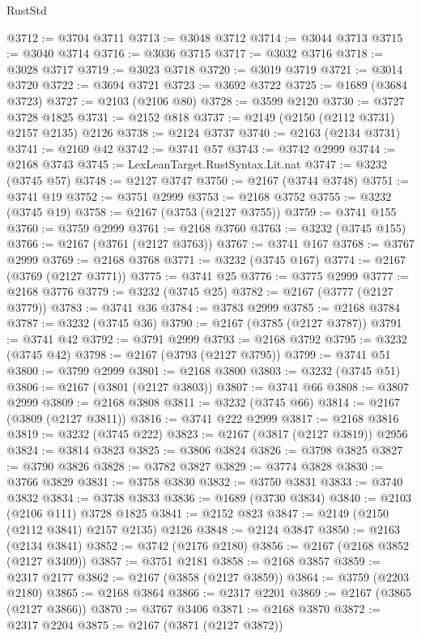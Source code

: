 \begin{lexlean}{RustStd}
\begin{coremodule}
{\begin{coremodule}
{{{{{{{{{{{{{{{{@3712 := @3704 @3711
@3713 := @3048 @3712
@3714 := @3044 @3713
@3715 := @3040 @3714
@3716 := @3036 @3715
@3717 := @3032 @3716
@3718 := @3028 @3717
@3719 := @3023 @3718
@3720 := @3019 @3719
@3721 := @3014 @3720
@3722 := @3694 @3721
@3723 := @3692 @3722
@3725 := @1689 (@3684 @3723)
@3727 := @2103 (@2106 @80)
@3728 := @3599 @2120
@3730 := @3727 @3728 @1825
@3731 := @2152 @818
@3737 := @2149 (@2150 (@2112 @3731) @2157 @2135) @2126
@3738 := @2124 @3737
@3740 := @2163 (@2134 @3731)
@3741 := @2169 @42
@3742 := @3741 @57
@3743 := @3742 @2999
@3744 := @2168 @3743
@3745 := LexLeanTarget.RustSyntax.Lit.nat
@3747 := @3232 (@3745 @57)
@3748 := @2127 @3747
@3750 := @2167 (@3744 @3748)
@3751 := @3741 @19
@3752 := @3751 @2999
@3753 := @2168 @3752
@3755 := @3232 (@3745 @19)
@3758 := @2167 (@3753 (@2127 @3755))
@3759 := @3741 @155
@3760 := @3759 @2999
@3761 := @2168 @3760
@3763 := @3232 (@3745 @155)
@3766 := @2167 (@3761 (@2127 @3763))
@3767 := @3741 @167
@3768 := @3767 @2999
@3769 := @2168 @3768
@3771 := @3232 (@3745 @167)
@3774 := @2167 (@3769 (@2127 @3771))
@3775 := @3741 @25
@3776 := @3775 @2999
@3777 := @2168 @3776
@3779 := @3232 (@3745 @25)
@3782 := @2167 (@3777 (@2127 @3779))
@3783 := @3741 @36
@3784 := @3783 @2999
@3785 := @2168 @3784
@3787 := @3232 (@3745 @36)
@3790 := @2167 (@3785 (@2127 @3787))
@3791 := @3741 @42
@3792 := @3791 @2999
@3793 := @2168 @3792
@3795 := @3232 (@3745 @42)
@3798 := @2167 (@3793 (@2127 @3795))
@3799 := @3741 @51
@3800 := @3799 @2999
@3801 := @2168 @3800
@3803 := @3232 (@3745 @51)
@3806 := @2167 (@3801 (@2127 @3803))
@3807 := @3741 @66
@3808 := @3807 @2999
@3809 := @2168 @3808
@3811 := @3232 (@3745 @66)
@3814 := @2167 (@3809 (@2127 @3811))
@3816 := @3741 @222 @2999
@3817 := @2168 @3816
@3819 := @3232 (@3745 @222)
@3823 := @2167 (@3817 (@2127 @3819)) @2956
@3824 := @3814 @3823
@3825 := @3806 @3824
@3826 := @3798 @3825
@3827 := @3790 @3826
@3828 := @3782 @3827
@3829 := @3774 @3828
@3830 := @3766 @3829
@3831 := @3758 @3830
@3832 := @3750 @3831
@3833 := @3740 @3832
@3834 := @3738 @3833
@3836 := @1689 (@3730 @3834)
@3840 := @2103 (@2106 @111) @3728 @1825
@3841 := @2152 @823
@3847 := @2149 (@2150 (@2112 @3841) @2157 @2135) @2126
@3848 := @2124 @3847
@3850 := @2163 (@2134 @3841)
@3852 := @3742 (@2176 @2180)
@3856 := @2167 (@2168 @3852 (@2127 @3409))
@3857 := @3751 @2181
@3858 := @2168 @3857
@3859 := @2317 @2177
@3862 := @2167 (@3858 (@2127 @3859))
@3864 := @3759 (@2203 @2180)
@3865 := @2168 @3864
@3866 := @2317 @2201
@3869 := @2167 (@3865 (@2127 @3866))
@3870 := @3767 @3406
@3871 := @2168 @3870
@3872 := @2317 @2204
@3875 := @2167 (@3871 (@2127 @3872))
}}}}}}}}}}}}}}}}
\end{coremodule}}
\end{coremodule}
\end{lexlean}
